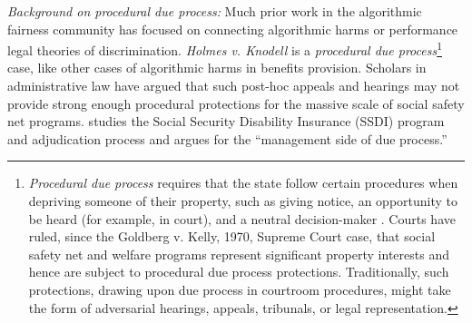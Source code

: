 \documentclass[manuscript,screen,authorversion]{acmart}
\begin{document}
\textit{Background on procedural due process:} Much prior work in the algorithmic fairness community has focused on connecting algorithmic harms or performance legal theories of discrimination. \textit{Holmes v. Knodell} is a \textit{procedural due process}\footnote{\textit{Procedural due process} requires that the state follow certain procedures when depriving someone of their property, such as giving notice, an opportunity to be heard (for example, in court), and a neutral decision-maker  \citep{ames2020due}. %
Courts have ruled, since the Goldberg v. Kelly, 1970, Supreme Court case, that social safety net and welfare programs represent significant property interests and hence are subject to procedural due process protections. 
Traditionally, such protections, drawing upon due process in courtroom procedures, might take the form of adversarial hearings, appeals, tribunals, or legal representation. } case, like other cases of algorithmic harms in benefits provision.  
Scholars in administrative law have argued that such post-hoc appeals and hearings may not provide strong enough procedural protections for the massive scale of social safety net programs. \citet{mashaw1973management} studies the Social Security Disability Insurance (SSDI) program and adjudication process and argues for the ``management side of due process.'' %
\end{document}
